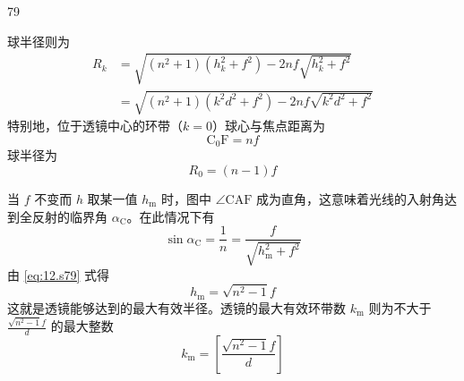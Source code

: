 \begin{solution}{79}
\begin{subsolution}
\begin{equation}
            \label{eq:8.s79}
        \end{equation}
        球半径则为
        \begin{align}
            R_{k} &= \sqrt{(n^{2} + 1)(h_{k}^{2} + f^{2}) - 2 n f \sqrt{h_{k}^{2} + f^{2}}} \nonumber \\
            &= \sqrt{(n^{2} + 1)(k^{2} d^{2} + f^{2}) - 2 n f \sqrt{k^{2} d^{2} + f^{2}}}
            \label{eq:9.s79}
        \end{align}
        特别地，位于透镜中心的环带（$k=0$）球心与焦点距离为
        \begin{equation}
            \mathrm{C}_{0} \mathrm{F} = n f
            \label{eq:10.s79}
        \end{equation}
        球半径为
        \begin{equation}
            R_{0} = (n - 1) f
            \label{eq:11.s79}
        \end{equation}
    \end{subsolution}
    \begin{subsolution}
        当 $f$ 不变而 $h$ 取某一值 $h_{\mathrm{m}}$ 时，图中 $\angle \mathrm{CAF}$ 成为直角，这意味着光线的入射角达到全反射的临界角 $\alpha_{\mathrm{C}}$。在此情况下有
        \begin{equation}
            \sin \alpha_{\mathrm{C}} = \frac{1}{n} = \frac{f}{\sqrt{h_{\mathrm{m}}^{2} + f^{2}}}
            \label{eq:12.s79}
        \end{equation}
        由 \eqref{eq:12.s79} 式得
        \begin{equation}
            h_{\mathrm{m}} = \sqrt{n^{2} - 1} f
            \label{eq:13.s79}
        \end{equation}
        这就是透镜能够达到的最大有效半径。透镜的最大有效环带数 $k_{\mathrm{m}}$ 则为不大于 $\frac{\sqrt{n^{2} - 1} f}{d}$ 的最大整数
        \begin{equation}
            k_{\mathrm{m}} = \left[ \frac{\sqrt{n^{2} - 1} f}{d} \right]
            \label{eq:14.s79}
        \end{equation}
    \end{subsolution}
\end{solution}